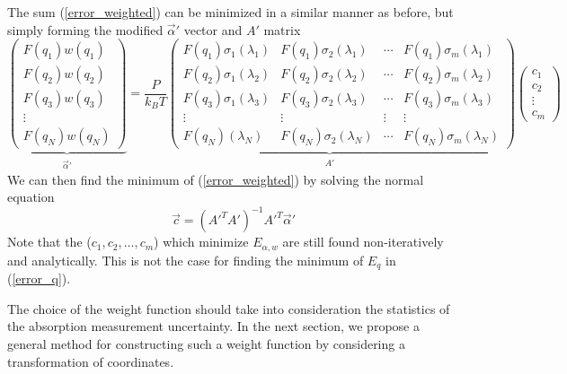 \documentclass[8pt,a4paper]{report}
\begin{document}
	The sum (\ref{error_weighted}) can be minimized in a similar manner as before, but simply forming the modified $\vec{\alpha}'$ vector and $A'$ matrix
	\begin{equation} \label{fit_spectrum_weighted}
		\underbrace{\begin{pmatrix}
				F(q_1) w(q_1) \\
				F(q_2) w(q_2) \\
				F(q_3) w(q_3) \\
				\vdots \\
				F(q_N) w(q_N)
		\end{pmatrix}}_{\begin{matrix}\vec{\alpha}' \end{matrix}} %
		=
		\underbrace{\frac{P}{k_B T}
			\begin{pmatrix}
				F(q_1)\sigma_1(\lambda_1) &  F(q_1)\sigma_2(\lambda_1) & \cdots & F(q_1)\sigma_m(\lambda_1) \\
				F(q_2)\sigma_1(\lambda_2) &  F(q_2)\sigma_2(\lambda_2) & \cdots & F(q_2)\sigma_m(\lambda_2) \\
				F(q_3)\sigma_1(\lambda_3) &  F(q_3)\sigma_2(\lambda_3) & \cdots & F(q_3)\sigma_m(\lambda_3) \\
				\vdots & \vdots& \vdots & \vdots \\
				F(q_N)(\lambda_N) & F(q_N)\sigma_2(\lambda_N) & \cdots &  F(q_N)\sigma_m(\lambda_N)
		\end{pmatrix}}_{\begin{matrix} A' \end{matrix}}
		\begin{pmatrix}
			c_1 \\
			c_2 \\
			\vdots \\
			c_m
		\end{pmatrix}
	\end{equation}
	We can then find the minimum of (\ref{error_weighted}) by solving the normal equation
	\begin{equation} \label{leastSquares_weighted}
		\vec{c} = (A'^T A')^{-1}A'^T \vec{\alpha}'
	\end{equation}
	Note that the ($c_1, c_2, \ldots, c_m$) which minimize $E_{\alpha,w}$ are still found non-iteratively and analytically. This is not the case for finding the minimum of $E_q$ in (\ref{error_q}).
	
	The choice of the weight function should take into consideration the statistics of the absorption measurement uncertainty. In the next section, we propose a general method for constructing such a weight function by considering a transformation of coordinates.
	
\end{document}
